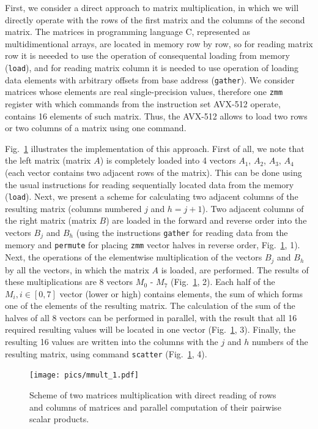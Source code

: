 \documentclass[
11pt,%
tightenlines,%
twoside,%
onecolumn,%
nofloats,%
nobibnotes,%
nofootinbib,%
superscriptaddress,%
noshowpacs,%
centertags]%
{revtex4}
\begin{document}
First, we consider a direct approach to matrix multiplication, in which we will directly operate with the rows of the first matrix and the columns of the second matrix.
The matrices in programming language C, represented as multidimentional arrays, are located in memory row by row, so for reading matrix row it is neeeded to use the operation of consequental loading from memory (\texttt{load}), and for reading matrix column it is needed to use operation of loading data elements with arbitrary offsets from base address (\texttt{gather}).
We consider matrices whose elements are real single-precision values, therefore one \texttt{zmm} register with which commands from the instruction set AVX-512 operate, contains 16 elements of such matrix.
Thus, the AVX-512 allows to load two rows or two columns of a matrix using one command.

Fig.~\ref{fig:mmult_1} illustrates the implementation of this approach.
First of all, we note that the left matrix (matrix $A$) is completely loaded into 4 vectors $A_1$, $A_2$, $A_3$, $A_4$ (each vector contains two adjacent rows of the matrix).
This can be done using the usual instructions for reading sequentially located data from the memory (\texttt{load}).
Next, we present a scheme for calculating two adjacent columns of the resulting matrix (columns numbered $j$ and $h = j + 1$).
Two adjacent columns of the right matrix (matrix $B$) are loaded in the forward and reverse order into the vectors $B_j$ and $B_h$ (using the instructions \texttt{gather} for reading data from the memory and \texttt{permute} for placing \texttt{zmm} vector halves in reverse order, Fig.~\ref{fig:mmult_1}, 1).
Next, the operations of the elementwise multiplication of the vectors $B_j$ and $B_h$ by all the vectors, in which the matrix $A$ is loaded, are performed.
The results of these multiplications are 8 vectors $M_0$ - $M_7$ (Fig.~\ref{fig:mmult_1}, 2).
Each half of the $M_i, i \in [0, 7]$ vector (lower or high) contains elements, the sum of which forms one of the elements of the resulting matrix.
The calculation of the sum of the halves of all 8 vectors can be performed in parallel, with the result that all 16 required resulting values will be located in one vector (Fig.~\ref{fig:mmult_1}, 3).
Finally, the resulting 16 values are written into the columns with the $j$ and $h$ numbers of the resulting matrix, using command \texttt{scatter} (Fig.~\ref{fig:mmult_1}, 4).


\begin{figure}[h]
\setcaptionmargin{5mm}
\onelinecaptionsfalse %
\texttt{[image: pics/mmult\_1.pdf]}
\caption{Scheme of two matrices multiplication with direct reading of rows and columns of matrices and parallel computation of their pairwise scalar products.}\label{fig:mmult_1}
\end{figure}
\end{document}
